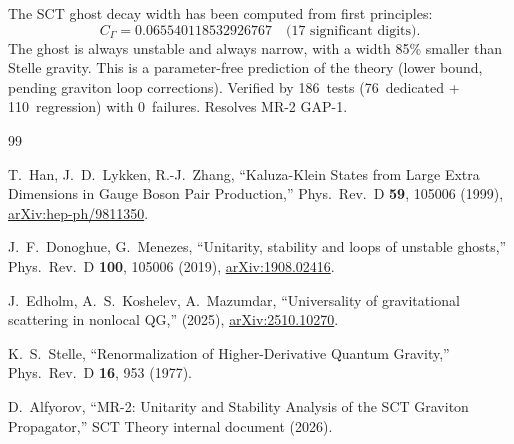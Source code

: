 \documentclass[11pt,a4paper]{article}
\begin{document}
The SCT ghost decay width has been computed from first principles:
\begin{equation}
  C_\Gamma = 0.065540118532926767
  \quad\text{(17 significant digits)}.
\end{equation}
The ghost is always unstable and always narrow, with a width 85\%
smaller than Stelle gravity.  This is a parameter-free prediction
of the theory (lower bound, pending graviton loop corrections).
Verified by 186~tests (76~dedicated + 110~regression) with 0~failures.
Resolves MR-2 GAP-1.


\begin{thebibliography}{99}

T.~Han, J.~D.~Lykken, R.-J.~Zhang,
``Kaluza-Klein States from Large Extra Dimensions in Gauge Boson Pair
Production,''
Phys.\ Rev.\ D \textbf{59}, 105006 (1999),
\href{https://arxiv.org/abs/hep-ph/9811350}{arXiv:hep-ph/9811350}.

J.~F.~Donoghue, G.~Menezes,
``Unitarity, stability and loops of unstable ghosts,''
Phys.\ Rev.\ D \textbf{100}, 105006 (2019),
\href{https://arxiv.org/abs/1908.02416}{arXiv:1908.02416}.

J.~Edholm, A.~S.~Koshelev, A.~Mazumdar,
``Universality of gravitational scattering in nonlocal QG,''
(2025),
\href{https://arxiv.org/abs/2510.10270}{arXiv:2510.10270}.

K.~S.~Stelle,
``Renormalization of Higher-Derivative Quantum Gravity,''
Phys.\ Rev.\ D \textbf{16}, 953 (1977).

D.~Alfyorov,
``MR-2: Unitarity and Stability Analysis of the SCT Graviton Propagator,''
SCT Theory internal document (2026).

\end{thebibliography}
\end{document}
